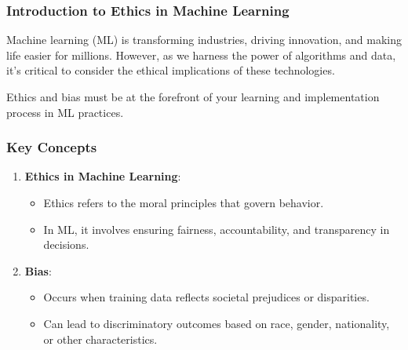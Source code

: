 \documentclass[aspectratio=169]{beamer}
\begin{document}
\begin{frame}
    \titlepage
\end{frame}

\begin{frame}
    \frametitle{Introduction to Ethics in Machine Learning}
    Machine learning (ML) is transforming industries, driving innovation, and making life easier for millions. 
    However, as we harness the power of algorithms and data, it's critical to consider the ethical implications of these technologies. 
    
    Ethics and bias must be at the forefront of your learning and implementation process in ML practices.
\end{frame}

\begin{frame}
    \frametitle{Key Concepts}
    \begin{enumerate}
        \item \textbf{Ethics in Machine Learning}:
            \begin{itemize}
                \item Ethics refers to the moral principles that govern behavior.
                \item In ML, it involves ensuring fairness, accountability, and transparency in decisions.
            \end{itemize}
        \item \textbf{Bias}:
            \begin{itemize}
                \item Occurs when training data reflects societal prejudices or disparities.
                \item Can lead to discriminatory outcomes based on race, gender, nationality, or other characteristics.
            \end{itemize}
    \end{enumerate}
\end{frame}
\end{document}
